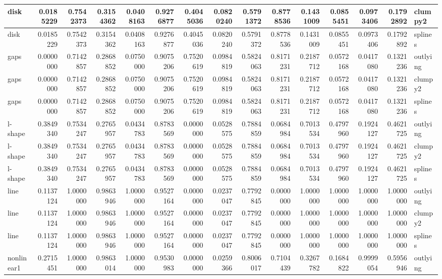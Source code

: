 \begin{Schunk}
\begin{tabular}{l|r|r|r|r|r|r|r|r|r|r|r|r|r|l}
\hline
disk & 0.0185229 & 0.7542373 & 0.3154362 & 0.0408163 & 0.9276877 & 0.4045036 & 0.0820240 & 0.5791372 & 0.8778536 & 0.1431009 & 0.0855451 & 0.0973406 & 0.1792892 & clumpy2\\
\hline
disk & 0.0185229 & 0.7542373 & 0.3154362 & 0.0408163 & 0.9276877 & 0.4045036 & 0.0820240 & 0.5791372 & 0.8778536 & 0.1431009 & 0.0855451 & 0.0973406 & 0.1792892 & splines\\
\hline
gaps & 0.0000000 & 0.7142857 & 0.2868852 & 0.0750000 & 0.9075206 & 0.7520619 & 0.0984819 & 0.5824063 & 0.8171231 & 0.2187712 & 0.0572168 & 0.0417080 & 0.1321236 & outlying\\
\hline
gaps & 0.0000000 & 0.7142857 & 0.2868852 & 0.0750000 & 0.9075206 & 0.7520619 & 0.0984819 & 0.5824063 & 0.8171231 & 0.2187712 & 0.0572168 & 0.0417080 & 0.1321236 & clumpy2\\
\hline
gaps & 0.0000000 & 0.7142857 & 0.2868852 & 0.0750000 & 0.9075206 & 0.7520619 & 0.0984819 & 0.5824063 & 0.8171231 & 0.2187712 & 0.0572168 & 0.0417080 & 0.1321236 & splines\\
\hline
l-shape & 0.3849340 & 0.7534247 & 0.2765957 & 0.0434783 & 0.8783569 & 0.0000000 & 0.0528575 & 0.7884859 & 0.0684984 & 0.7013534 & 0.4797960 & 0.1924127 & 0.4621725 & outlying\\
\hline
l-shape & 0.3849340 & 0.7534247 & 0.2765957 & 0.0434783 & 0.8783569 & 0.0000000 & 0.0528575 & 0.7884859 & 0.0684984 & 0.7013534 & 0.4797960 & 0.1924127 & 0.4621725 & clumpy2\\
\hline
l-shape & 0.3849340 & 0.7534247 & 0.2765957 & 0.0434783 & 0.8783569 & 0.0000000 & 0.0528575 & 0.7884859 & 0.0684984 & 0.7013534 & 0.4797960 & 0.1924127 & 0.4621725 & splines\\
\hline
line & 0.1137124 & 1.0000000 & 0.9863946 & 1.0000000 & 0.9527164 & 0.0000000 & 0.0237047 & 0.7792845 & 0.0000000 & 1.0000000 & 1.0000000 & 1.0000000 & 1.0000000 & outlying\\
\hline
line & 0.1137124 & 1.0000000 & 0.9863946 & 1.0000000 & 0.9527164 & 0.0000000 & 0.0237047 & 0.7792845 & 0.0000000 & 1.0000000 & 1.0000000 & 1.0000000 & 1.0000000 & clumpy2\\
\hline
line & 0.1137124 & 1.0000000 & 0.9863946 & 1.0000000 & 0.9527164 & 0.0000000 & 0.0237047 & 0.7792845 & 0.0000000 & 1.0000000 & 1.0000000 & 1.0000000 & 1.0000000 & splines\\
\hline
nonlinear1 & 0.2715451 & 1.0000000 & 0.9863014 & 1.0000000 & 0.9530983 & 0.0000000 & 0.0259366 & 0.8006017 & 0.7104439 & 0.3267782 & 0.1684822 & 0.9999054 & 0.5956946 & outlying\\

\end{tabular}
\end{Schunk}
